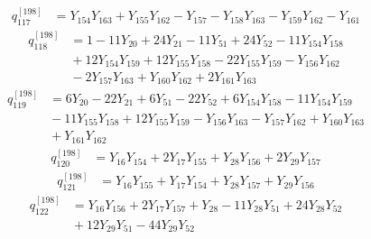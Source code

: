 \begin{equation}\label{q198:row:117}
\begin{aligned}
q_{117}^{[198]} &={} Y_{154}Y_{163} + Y_{155}Y_{162} - Y_{157} - Y_{158}Y_{163} - Y_{159}Y_{162} - Y_{161}
\end{aligned}
\end{equation}
\begin{equation}\label{q198:row:118}
\begin{aligned}
q_{118}^{[198]} &={} 1 - 11Y_{20} + 24Y_{21} - 11Y_{51} + 24Y_{52} - 11Y_{154}Y_{158}\\
&{} + 12Y_{154}Y_{159} + 12Y_{155}Y_{158} - 22Y_{155}Y_{159} - Y_{156}Y_{162}\\
&{} - 2Y_{157}Y_{163} + Y_{160}Y_{162} + 2Y_{161}Y_{163}
\end{aligned}
\end{equation}
\begin{equation}\label{q198:row:119}
\begin{aligned}
q_{119}^{[198]} &={} 6Y_{20} - 22Y_{21} + 6Y_{51} - 22Y_{52} + 6Y_{154}Y_{158} - 11Y_{154}Y_{159}\\
&{} - 11Y_{155}Y_{158} + 12Y_{155}Y_{159} - Y_{156}Y_{163} - Y_{157}Y_{162} + Y_{160}Y_{163}\\
&{} + Y_{161}Y_{162}
\end{aligned}
\end{equation}
\begin{equation}\label{q198:row:120}
\begin{aligned}
q_{120}^{[198]} &={} Y_{16}Y_{154} + 2Y_{17}Y_{155} + Y_{28}Y_{156} + 2Y_{29}Y_{157}
\end{aligned}
\end{equation}
\begin{equation}\label{q198:row:121}
\begin{aligned}
q_{121}^{[198]} &={} Y_{16}Y_{155} + Y_{17}Y_{154} + Y_{28}Y_{157} + Y_{29}Y_{156}
\end{aligned}
\end{equation}
\begin{equation}\label{q198:row:122}
\begin{aligned}
q_{122}^{[198]} &={} Y_{16}Y_{156} + 2Y_{17}Y_{157} + Y_{28} - 11Y_{28}Y_{51} + 24Y_{28}Y_{52}\\
&{} + 12Y_{29}Y_{51} - 44Y_{29}Y_{52}
\end{aligned}
\end{equation}
